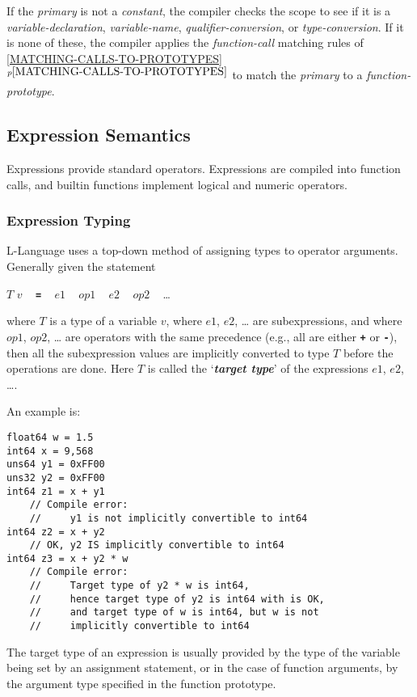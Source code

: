 \documentclass[12pt]{article}
\newcommand{\TT}[1]{{\tt \bfseries #1}}
\newcommand{\key}[1]{{\bf \em #1}\index{#1}}
\newcommand{\itemref}[1]{\ref{#1}$^{p\pageref{#1}}$}
\newenvironment{indpar}[1][0.3in]%
	{\begin{list}{}%
		     {\setlength{\itemsep}{0in}%
		      \setlength{\topsep}{0in}%
		      \setlength{\parsep}{1ex}%
		      \setlength{\labelwidth}{#1}%
		      \setlength{\leftmargin}{#1}%
		      \addtolength{\leftmargin}{\labelsep}}%
	 \item}%
	{\end{list}}
\begin{document}
If the {\em primary} is not a {\em constant}, the compiler
checks the scope to see if it is a {\em variable-declaration},
{\em variable-name}, {\em qualifier-conversion}, or
{\em type-conversion}.  If it is none of these, the
compiler applies the {\em function-call} matching rules of
\itemref{MATCHING-CALLS-TO-PROTOTYPES}
to match the {\em primary} to a {\em function-prototype}.

\subsection{Expression Semantics}

Expressions provide standard operators.  Expressions are compiled
into function calls, and builtin functions
implement logical and numeric operators.

\subsubsection{Expression Typing}
\label{EXPRESSION-TYPING}

L-Language uses a top-down method of assigning types to operator arguments.
Generally given the statement
\begin{center}
$T$ $v$ ~ \TT{=} ~ $e1$ ~ $op1$ ~ $e2$ ~ $op2$ ~ \ldots{}
\end{center}
where $T$ is a type of a variable $v$, where $e1$, $e2$, \ldots{} are
subexpressions, and where $op1$, $op2$, \ldots{} are operators with the
same precedence (e.g., all are either \TT{+} or \TT{-}), then
all the subexpression values are implicitly converted to type $T$
before the operations are done.  Here $T$ is called the `\key{target type}'
of the expressions $e1$, $e2$, \ldots{}.

An example is:

\begin{indpar}\begin{verbatim}
float64 w = 1.5
int64 x = 9,568
uns64 y1 = 0xFF00
uns32 y2 = 0xFF00
int64 z1 = x + y1
    // Compile error:
    //     y1 is not implicitly convertible to int64
int64 z2 = x + y2
    // OK, y2 IS implicitly convertible to int64
int64 z3 = x + y2 * w
    // Compile error:
    //     Target type of y2 * w is int64,
    //     hence target type of y2 is int64 with is OK,
    //     and target type of w is int64, but w is not
    //     implicitly convertible to int64
\end{verbatim}\end{indpar}

The target type of an expression is usually provided by the
type of the variable being set by an assignment statement, or in the
case of function arguments, by the argument type specified in the
function prototype.
\end{document}
